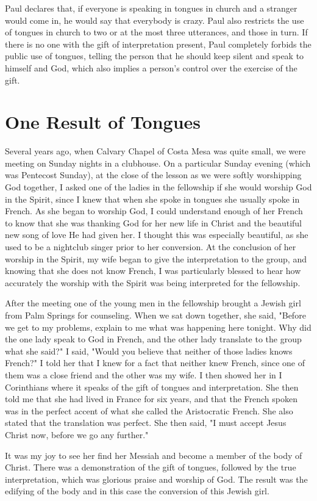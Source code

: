 Paul declares that, if everyone is speaking in tongues in church and a stranger would come in, he would say that everybody is crazy. Paul also restricts the use of tongues in church to two or at the most three utterances, and those in turn. If there is no one with the gift of interpretation present, Paul completely forbids the public use of tongues, telling the person that he should keep silent and speak to himself and God, which also implies a person's control over the exercise of the gift. 

\section*{One Result of Tongues}

Several years ago, when Calvary Chapel of Costa Mesa was quite small, we were meeting on Sunday nights in a clubhouse. On a particular Sunday evening (which was Pentecost Sunday), at the close of the lesson as we were softly worshipping God together, I asked one of the ladies in the fellowship if she would worship God in the Spirit, since I knew that when she spoke in tongues she usually spoke in French. As she began to worship God, I could understand enough of her French to know that she was thanking God for her new life in Christ and the beautiful new song of love He had given her. I thought this was especially beautiful, as she used to be a nightclub singer prior to her conversion. At the conclusion of her worship in the Spirit, my wife began to give the interpretation to the group, and knowing that she does not know French, I was particularly blessed to hear how accurately the worship with the Spirit was being interpreted for the fellowship. 

After the meeting one of the young men in the fellowship brought a Jewish girl from Palm Springs for counseling. When we sat down together, she said, "Before we get to my problems, explain to me what was happening here tonight. Why did the one lady speak to God in French, and the other lady translate to the group what she said?" I said, "Would you believe that neither of those ladies knows French?" I told her that I knew for a fact that neither knew French, since one of them was a close friend and the other was my wife. I then showed her in I Corinthians where it speaks of the gift of tongues and interpretation. She then told me that she had lived in France for six years, and that the French spoken was in the perfect accent of what she called the Aristocratic French. She also stated that the translation was perfect. She then said, "I must accept Jesus Christ now, before we go any further." 

It was my joy to see her find her Messiah and become a member of the body of Christ. There was a demonstration of the gift of tongues, followed by the true interpretation, which was glorious praise and worship of God. The result was the edifying of the body and in this case the conversion of this Jewish girl. 


